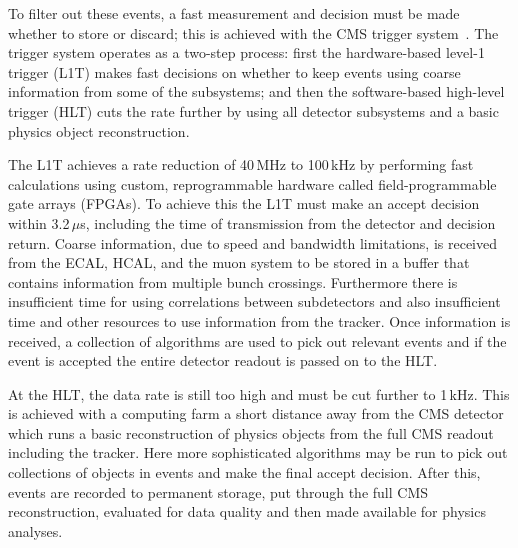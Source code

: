 To filter out these events, a fast measurement and decision must be made whether to store or discard; this is achieved with the CMS trigger system~\cite{trigger}. The trigger system operates as a two-step process: first the hardware-based level-1 trigger (L1T) makes fast decisions on whether to keep events using coarse information from some of the subsystems; and then the software-based high-level trigger (HLT) cuts the rate further by using all detector subsystems and a basic physics object reconstruction. 


The L1T achieves a rate reduction of 40\,MHz to 100\,kHz by performing fast calculations using custom, reprogrammable hardware called field-programmable gate arrays (FPGAs).
To achieve this the L1T must make an accept decision within 3.2\,$\mu$s, including the time of transmission from the detector and decision return. 
Coarse information, due to speed and bandwidth limitations, is received from the ECAL, HCAL, and the muon system to be stored in a buffer that contains information from multiple bunch crossings. 
Furthermore there is insufficient time for using correlations between subdetectors and also insufficient time and other resources to use information from the tracker. 
Once information is received, a collection of algorithms are used to pick out relevant events and if the event is accepted the entire detector readout is passed on to the HLT.


At the HLT, the data rate is still too high and must be cut further to 1\,kHz. This is achieved with a computing farm a short distance away from the CMS detector which runs a basic reconstruction of physics objects from the full CMS readout including the tracker. Here more sophisticated algorithms may be run to pick out collections of objects in events and make the final accept decision.
After this, events are recorded to permanent storage, put through the full CMS reconstruction, evaluated for data quality and then made available for physics analyses. 





